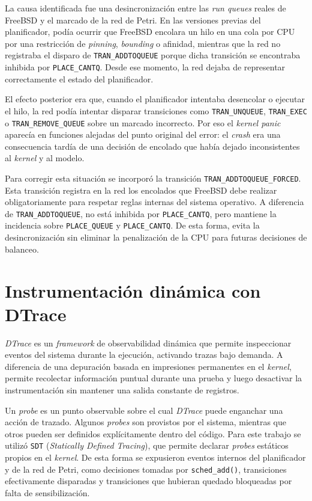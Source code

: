 La causa identificada fue una desincronización entre las \textit{run queues} reales de FreeBSD y el marcado de la red de Petri. En las versiones previas del planificador, podía ocurrir que FreeBSD encolara un hilo en una cola por CPU por una restricción de \textit{pinning}, \textit{bounding} o afinidad, mientras que la red no registraba el disparo de \verb|TRAN_ADDTOQUEUE| porque dicha transición se encontraba inhibida por \verb|PLACE_CANTQ|. Desde ese momento, la red dejaba de representar correctamente el estado del planificador.\par

El efecto posterior era que, cuando el planificador intentaba desencolar o ejecutar el hilo, la red podía intentar disparar transiciones como \verb|TRAN_UNQUEUE|, \verb|TRAN_EXEC| o \verb|TRAN_REMOVE_QUEUE| sobre un marcado incorrecto. Por eso el \textit{kernel panic} aparecía en funciones alejadas del punto original del error: el \textit{crash} era una consecuencia tardía de una decisión de encolado que había dejado inconsistentes al \textit{kernel} y al modelo.\par

Para corregir esta situación se incorporó la transición \verb|TRAN_ADDTOQUEUE_FORCED|. Esta transición registra en la red los encolados que FreeBSD debe realizar obligatoriamente para respetar reglas internas del sistema operativo. A diferencia de \verb|TRAN_ADDTOQUEUE|, no está inhibida por \verb|PLACE_CANTQ|, pero mantiene la incidencia sobre \verb|PLACE_QUEUE| y \verb|PLACE_CANTQ|. De esta forma, evita la desincronización sin eliminar la penalización de la CPU para futuras decisiones de balanceo.\par

\section{Instrumentación dinámica con DTrace}
\label{appendix:dtrace-sdt}

\textit{DTrace} es un \textit{framework} de observabilidad dinámica que permite inspeccionar eventos del sistema durante la ejecución, activando trazas bajo demanda. A diferencia de una depuración basada en impresiones permanentes en el \textit{kernel}, permite recolectar información puntual durante una prueba y luego desactivar la instrumentación sin mantener una salida constante de registros.\par

Un \textit{probe} es un punto observable sobre el cual \textit{DTrace} puede enganchar una acción de trazado. Algunos \textit{probes} son provistos por el sistema, mientras que otros pueden ser definidos explícitamente dentro del código. Para este trabajo se utilizó \verb|SDT| (\textit{Statically Defined Tracing}), que permite declarar \textit{probes} estáticos propios en el \textit{kernel}. De esta forma se expusieron eventos internos del planificador y de la red de Petri, como decisiones tomadas por \verb|sched_add()|, transiciones efectivamente disparadas y transiciones que hubieran quedado bloqueadas por falta de sensibilización.\par

